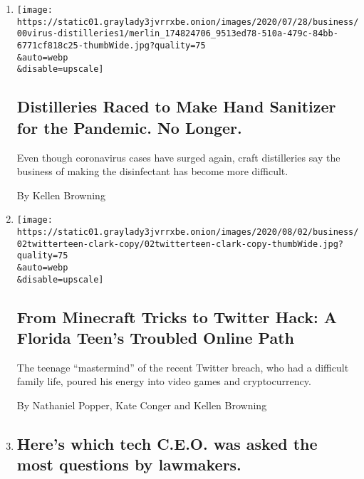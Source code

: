 \begin{enumerate}
\def\labelenumi{\arabic{enumi}.}
\item
  \href{/2020/08/04/business/distilleries-hand-sanitizer-pandemic.html}{}

  \texttt{[image: https://static01.graylady3jvrrxbe.onion/images/2020/07/28/business/00virus-distilleries1/merlin\_174824706\_9513ed78-510a-479c-84bb-6771cf818c25-thumbWide.jpg?quality=75\\\&auto=webp\\\&disable=upscale]}

  \hypertarget{distilleries-raced-to-make-hand-sanitizer-for-the-pandemic-no-longer}{%
  \subsection{Distilleries Raced to Make Hand Sanitizer for the
  Pandemic. No
  Longer.}\label{distilleries-raced-to-make-hand-sanitizer-for-the-pandemic-no-longer}}

  Even though coronavirus cases have surged again, craft distilleries
  say the business of making the disinfectant has become more difficult.

  By Kellen Browning
\item
  \href{/2020/08/02/technology/florida-teenager-twitter-hack.html}{}

  \texttt{[image: https://static01.graylady3jvrrxbe.onion/images/2020/08/02/business/02twitterteen-clark-copy/02twitterteen-clark-copy-thumbWide.jpg?quality=75\\\&auto=webp\\\&disable=upscale]}

  \hypertarget{from-minecraft-tricks-to-twitter-hack-a-florida-teens-troubled-online-path}{%
  \subsection{From Minecraft Tricks to Twitter Hack: A Florida Teen's
  Troubled Online
  Path}\label{from-minecraft-tricks-to-twitter-hack-a-florida-teens-troubled-online-path}}

  The teenage ``mastermind'' of the recent Twitter breach, who had a
  difficult family life, poured his energy into video games and
  cryptocurrency.

  By Nathaniel Popper, Kate Conger and Kellen Browning
\item
  \href{/live/2020/07/29/technology/tech-ceos-hearing-testimony/heres-which-tech-ceo-was-asked-the-most-questions-by-lawmakers}{}

  \hypertarget{heres-which-tech-ceo-was-asked-the-most-questions-by-lawmakers}{%
  \subsection{Here's which tech C.E.O. was asked the most questions by
  lawmakers.}\label{heres-which-tech-ceo-was-asked-the-most-questions-by-lawmakers}}


\end{enumerate}
